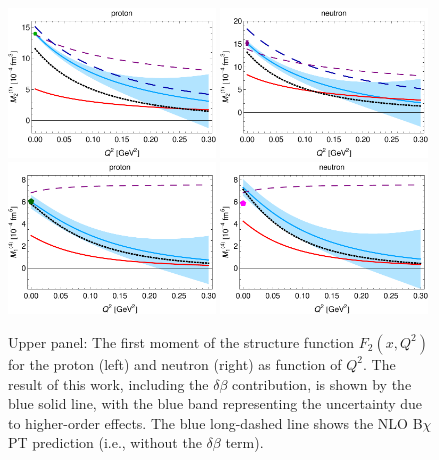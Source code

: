 \documentclass[12pt,preprint,tightenlines,
showpacs,preprintnumbers,amsmath,amssymb,
a4paper,nofootinbib]{revtex4-2}
\begin{document}
\begin{figure}[tbh]
\begin{center}
 \includegraphics[width=0.49\textwidth]{M21_p-Dip.pdf}
  \includegraphics[width=0.49\textwidth]{M21_n-Dip.pdf}\\[0.2cm]
   \includegraphics[width=0.49\textwidth]{M14_p-Dip.pdf}
    \includegraphics[width=0.49\textwidth]{M14_n-Dip.pdf}
\caption{\small{
Upper panel: The first moment of the structure function $F_2(x,Q^2)$ for the proton (left) and neutron (right) as function of $Q^2$.  
The result of this work, including the $\delta\beta$ contribution, is shown by the blue solid line, with the blue band representing the uncertainty due to higher-order effects. The blue long-dashed line shows the NLO B$\chi$PT prediction (i.e., without the $\delta\beta$ term).
}}
\end{center}
\end{figure}
\end{document}
